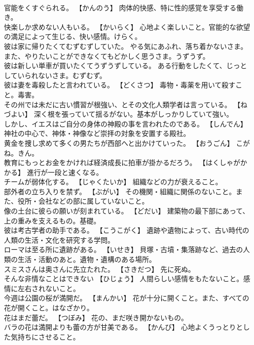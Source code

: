 \documentclass[8pt]{extreport}
\begin{document}
\begin{CJK}{UTF8}{min}
\\	官能をくすぐられる。	【かんのう】 肉体的快感、特に性的感覚を享受する働き。
\\	快楽しか求めない人もいる。	【かいらく】 心地よく楽しいこと。官能的な欲望の満足によって生じる、快い感情。けらく。
\\	彼は家に帰りたくてむずむずしていた。	やる気にあふれ、落ち着かないさま。また、やりたいことができなくてもどかしく思うさま。うずうず。
\\	彼は新しい単車が買いたくてうずうずしている。	ある行動をしたくて、じっとしていられないさま。むずむず。
\\	彼は妻を毒殺したと言われている。	【どくさつ】 毒物・毒薬を用いて殺すこと。毒害。
\\	その州では未だに古い慣習が根強い、とその文化人類学者は言っている。	【ねづよい】 深く根を張っていて揺るがない。基本がしっかりしていて強い。
\\	しかし、イエスはご自分の身体の神殿の事を言われたのである。	【しんでん】 神社の中心で、神体・神像など崇拝の対象を安置する殿社。
\\	黄金を捜し求めて多くの男たちが西部へと出かけていった。	【おうごん】 こがね。きん。
\\	教育にもっとお金をかければ経済成長に拍車が掛かるだろう。	【はくしゃがかかる】 進行が一段と速くなる。
\\	チームが弱体化する。	【じゃくたいか】 組織などの力が衰えること。
\\	部外者の立ち入りを禁ず。	【ぶがい】 その機関・組織に関係のないこと。また、役所・会社などの部に属していないこと。
\\	像の土台に彼らの願いが刻まれている。	【どだい】 建築物の最下部にあって、上の重みを支えるもの。基礎。
\\	彼は考古学者の助手である。	【こうこがく】 遺跡や遺物によって、古い時代の人類の生活・文化を研究する学問。
\\	ローマは至る所に遺跡がある。	【いせき】 貝塚・古墳・集落跡など、過去の人類の生活・活動のあと。遺物・遺構のある場所。
\\	スミスさんは奥さんに先立たれた。	【さきだつ】 先に死ぬ。
\\	そんな非情なことはできない	【ひじょう】 人間らしい感情をもたないこと。感情に左右されないこと。
\\	今週は公園の桜が満開だ。	【まんかい】 花が十分に開くこと。また、すべての花が開くこと。はなざかり。
\\	花はまだ蕾だ。	【つぼみ】 花の、まだ咲き開かないもの。
\\	バラの花は満開よりも蕾の方が甘美である。	【かんび】 心地よくうっとりとした気持ちにさせること。

\end{CJK}
\end{document}
